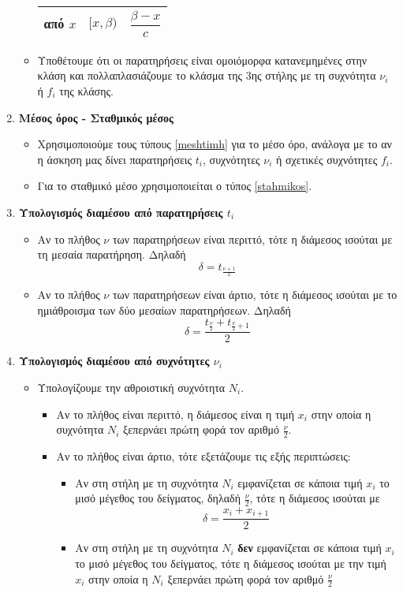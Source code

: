\documentclass[a4paper,11pt]{article}
\begin{document}
\begin{enumerate}[label=\bf\thesection.\arabic*.]
\begin{itemize}
\begin{center}
\begin{tabular}{c|cc}
\rule[-2ex]{0pt}{5.5ex} από $ x $ & $ [x,\beta) $ & $ \dfrac{\beta-x}{c} $ \\
\hline
\end{tabular}
\end{center}
\item Υποθέτουμε ότι οι παρατηρήσεις είναι ομοιόμορφα κατανεμημένες στην κλάση και πολλαπλασιάζουμε το κλάσμα της 3ης στήλης με τη συχνότητα $ \nu_i $ ή $ f_i $ της κλάσης.
\end{itemize}
\item\textbf{Μέσος όρος - Σταθμικός μέσος}
\begin{itemize}
\item Χρησιμοποιούμε τους τύπους \ref{meshtimh} για το μέσο όρο, ανάλογα με το αν η άσκηση μας δίνει παρατηρήσεις $t_i$, συχνότητες $\nu_i$ ή σχετικές συχνότητες $f_i$.
\item Για το σταθμικό μέσο χρησιμοποιείται ο τύπος \ref{stahmikos}.
\end{itemize}
\item\textbf{Υπολογισμός διαμέσου από παρατηρήσεις $t_i$}
\begin{itemize}
\item Αν το πλήθος $\nu$ των παρατηρήσεων είναι περιττό, τότε η διάμεσος ισούται με τη μεσαία παρατήρηση. Δηλαδή
\[ \delta=t_{\frac{\nu+1}{2}} \]
\item Αν το πλήθος $\nu$ των παρατηρήσεων είναι άρτιο, τότε η διάμεσος ισούται με το ημιάθροισμα των δύο μεσαίων παρατηρήσεων. Δηλαδή
\[ \delta=\frac{t_{\frac{\nu}{2}}+t_{\frac{\nu}{2}+1}}{2} \]
\end{itemize}
\item\textbf{Υπολογισμός διαμέσου από συχνότητες $\nu_i$}\label{diamesos1}
\begin{itemize}
\item Υπολογίζουμε την αθροιστική συχνότητα $N_i$.
\begin{itemize}[leftmargin=4mm]
\item Αν το πλήθος είναι περιττό, η διάμεσος είναι η τιμή $x_i$ στην οποία η συχνότητα $N_i$ ξεπερνάει πρώτη φορά τον αριθμό $\frac{\nu}{2}$.
\item Αν το πλήθος είναι άρτιο, τότε εξετάζουμε τις εξής περιπτώσεις:
\begin{itemize}
\item Αν στη στήλη με τη συχνότητα $N_i$ εμφανίζεται σε κάποια τιμή $x_i$ το μισό μέγεθος του δείγματος, δηλαδή $\frac{\nu}{2}$, τότε η διάμεσος ισούται με 
\[ \delta=\frac{x_i+x_{i+1}}{2} \]
\item Αν στη στήλη με τη συχνότητα $N_i$ \textbf{δεν} εμφανίζεται σε κάποια τιμή $x_i$ το μισό μέγεθος του δείγματος, τότε η διάμεσος ισούται με την τιμή $x_i$ στην οποία η $N_i$ ξεπερνάει πρώτη φορά τον αριθμό $\frac{\nu}{2}$

\end{itemize}
\end{itemize}
\end{itemize}
\end{enumerate}
\end{document}
